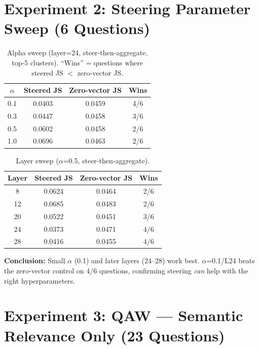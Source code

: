 \documentclass[10pt,a4paper]{article}
\begin{document}
\section{Experiment 2: Steering Parameter Sweep (6 Questions)}

\begin{table}[h]
\centering\small
\caption{Alpha sweep (layer=24, steer-then-aggregate, top-5 clusters). ``Wins'' = questions where steered JS $<$ zero-vector JS.}
\begin{tabular}{@{}cccc@{}}
\toprule
$\alpha$ & Steered JS & Zero-vector JS & Wins \\
\midrule
\rowcolor{best} 0.1 & 0.0403 & 0.0459 & 4/6 \\
0.3 & 0.0447 & 0.0458 & 3/6 \\
0.5 & 0.0602 & 0.0458 & 2/6 \\
1.0 & 0.0696 & 0.0463 & 2/6 \\
\bottomrule
\end{tabular}
\end{table}

\begin{table}[h]
\centering\small
\caption{Layer sweep ($\alpha$=0.5, steer-then-aggregate).}
\begin{tabular}{@{}cccc@{}}
\toprule
Layer & Steered JS & Zero-vector JS & Wins \\
\midrule
8 & 0.0624 & 0.0464 & 2/6 \\
12 & 0.0685 & 0.0483 & 2/6 \\
20 & 0.0522 & 0.0451 & 3/6 \\
\rowcolor{best} 24 & 0.0373 & 0.0471 & 4/6 \\
\rowcolor{best} 28 & 0.0416 & 0.0455 & 4/6 \\
\bottomrule
\end{tabular}
\end{table}

\textbf{Conclusion:} Small $\alpha$ (0.1) and later layers (24--28) work best. $\alpha$=0.1/L24 beats the zero-vector control on 4/6 questions, confirming steering \emph{can} help with the right hyperparameters.

\section{Experiment 3: QAW --- Semantic Relevance Only (23 Questions)}
\end{document}
